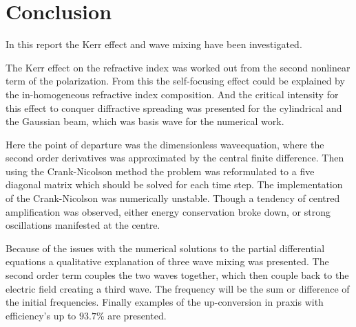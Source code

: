 \chapter{Conclusion}
\label{cha:conclusion}

In this report the Kerr effect and wave mixing have been investigated. 

The Kerr effect on the refractive index was worked out from the second nonlinear term of the
polarization. From this the self-focusing effect could be explained by the in-homogeneous
refractive index composition.  And the critical intensity for this effect to conquer diffractive
spreading was presented for the cylindrical and the Gaussian beam, which was basis wave for the
numerical work.

Here the point of departure was the dimensionless waveequation, where the second order derivatives
was approximated by the central finite difference. Then using the Crank-Nicolson method the
problem was reformulated to a five diagonal matrix which should be solved for each time
step. The implementation of the Crank-Nicolson was numerically unstable. Though a tendency of
centred amplification was observed, either energy conservation broke down, or strong oscillations
manifested at the centre.


Because of the issues with the numerical solutions to the partial differential equations a
qualitative explanation of three wave mixing was presented. The second order term couples the
two waves together, which then couple back to the electric field creating a third wave. The
frequency will be the sum or difference of the initial frequencies.
Finally examples of the up-conversion in praxis with efficiency's up to
$93.7\%$ are presented.



